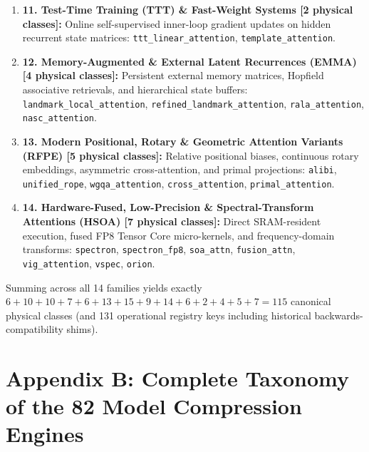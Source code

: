 \documentclass{article}
\begin{document}
\begin{enumerate}
    \item \textbf{11. Test-Time Training (TTT) \& Fast-Weight Systems [2 physical classes]:} Online self-supervised inner-loop gradient updates on hidden recurrent state matrices:
    \texttt{ttt\_linear\_attention}, \texttt{template\_attention}.
    \item \textbf{12. Memory-Augmented \& External Latent Recurrences (EMMA) [4 physical classes]:} Persistent external memory matrices, Hopfield associative retrievals, and hierarchical state buffers:
    \texttt{landmark\_local\_attention}, \texttt{refined\_landmark\_attention}, \texttt{rala\_attention}, \texttt{nasc\_attention}.
    \item \textbf{13. Modern Positional, Rotary \& Geometric Attention Variants (RFPE) [5 physical classes]:} Relative positional biases, continuous rotary embeddings, asymmetric cross-attention, and primal projections:
    \texttt{alibi}, \texttt{unified\_rope}, \texttt{wgqa\_attention}, \texttt{cross\_attention}, \texttt{primal\_attention}.
    \item \textbf{14. Hardware-Fused, Low-Precision \& Spectral-Transform Attentions (HSOA) [7 physical classes]:} Direct SRAM-resident execution, fused FP8 Tensor Core micro-kernels, and frequency-domain transforms:
    \texttt{spectron}, \texttt{spectron\_fp8}, \texttt{soa\_attn}, \texttt{fusion\_attn}, \texttt{vig\_attention}, \texttt{vspec}, \texttt{orion}.
\end{enumerate}
Summing across all 14 families yields exactly $6 + 10 + 10 + 7 + 6 + 13 + 15 + 9 + 14 + 6 + 2 + 4 + 5 + 7 = 115$ canonical physical classes (and 131 operational registry keys including historical backwards-compatibility shims).

\section{Appendix B: Complete Taxonomy of the 82 Model Compression Engines}
\label{sec:appendix_compressors}
\end{document}
